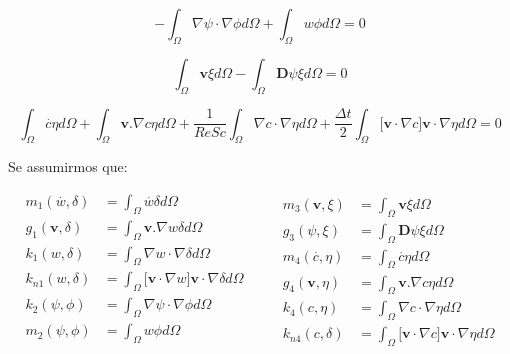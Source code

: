 \begin{equation}
 - \int_{\Omega} \nabla \psi \cdot \nabla \phi d\Omega
 + \int_{\Omega} w \phi d\Omega = 0
\end{equation}

\begin{equation}
   \int_{\Omega} \textbf{v} \xi d\Omega
 - \int_{\Omega} \textbf{D}\psi \xi d\Omega = 0
\end{equation}

\begin{equation} \label{concentration weak}
   \int_{\Omega} \overset{.}{c} \eta d\Omega
 + \int_{\Omega} \textbf{v}.\nabla c \eta d\Omega
 + \frac{1}{\textit{ReSc}} \int_{\Omega} \nabla c \cdot \nabla \eta d\Omega 
 + \frac{\Delta t}{2} \int_{\Omega} \big[ \textbf{v} \cdot \nabla c \big] \textbf{v} \cdot \nabla \eta d\Omega
 = 0
\end{equation}

\medskip
\noindent
Se assumirmos que:

\begin{equation}
 \begin{aligned}
  \textbf{$m_1$}(\overset{.}{w},\delta) & = \int_{\Omega} \overset{.}{w} \delta d\Omega \\ 
  \textbf{$g_1$}(\textbf{v},\delta) & = \int_{\Omega} \textbf{v}.\nabla w \delta d\Omega \\
  \textbf{$k_1$}(w,\delta) & = \int_{\Omega} \nabla w \cdot \nabla \delta d\Omega \\
  \textbf{$k_{n1}$}(w,\delta) & = \int_{\Omega} \big[ \textbf{v} \cdot \nabla w \big] \textbf{v} \cdot \nabla \delta d\Omega \\
  \textbf{$k_2$}(\psi,\phi) & = \int_{\Omega} \nabla \psi \cdot \nabla \phi d\Omega \\
  \textbf{$m_2$}(\psi,\phi) & = \int_{\Omega} w \phi d\Omega \\
 \end{aligned}
 \qquad
 \begin{aligned}  
  \textbf{$m_3$}(\textbf{v},\xi) & = \int_{\Omega} \textbf{v} \xi d\Omega \\
  \textbf{$g_3$}(\psi,\xi) & = \int_{\Omega} \textbf{D}\psi \xi d\Omega \\
  \textbf{$m_4$}(\overset{.}{c},\eta) & = \int_{\Omega} \overset{.}{c} \eta d\Omega \\
  \textbf{$g_4$}(\textbf{v},\eta) & = \int_{\Omega} \textbf{v}.\nabla c \eta d\Omega \\
  \textbf{$k_4$}(c,\eta) & = \int_{\Omega} \nabla c \cdot \nabla \eta d\Omega \\
  \textbf{$k_{n4}$}(c,\delta) & = \int_{\Omega} \big[ \textbf{v} \cdot \nabla c \big] \textbf{v} \cdot \nabla \eta d\Omega 
 \end{aligned}
\end{equation}

